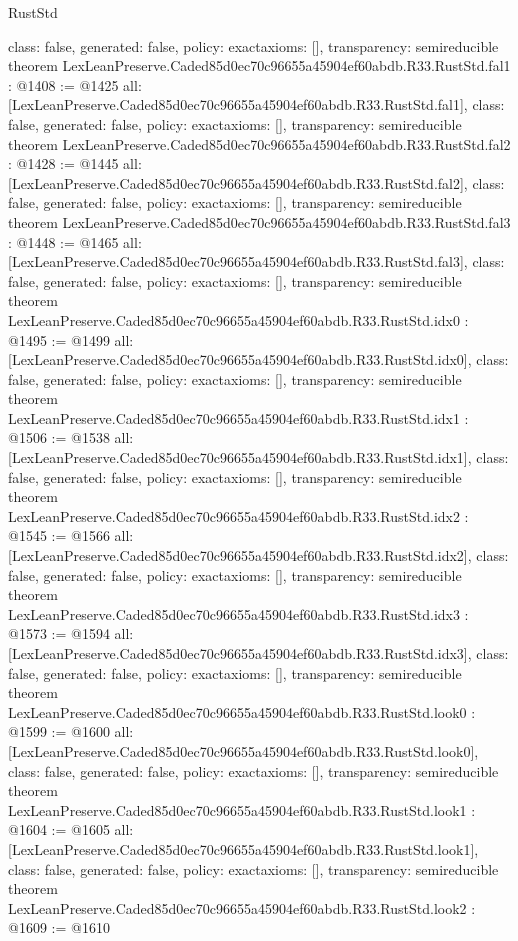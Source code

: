 \begin{lexlean}{RustStd}
\begin{coremodule}
{  class: false,
  generated: false,
  policy: exact{axioms: []},
  transparency: semireducible
}
theorem LexLeanPreserve.Caded85d0ec70c96655a45904ef60abdb.R33.RustStd.fal1 : @1408 := @1425 {
  all: [LexLeanPreserve.Caded85d0ec70c96655a45904ef60abdb.R33.RustStd.fal1],
  class: false,
  generated: false,
  policy: exact{axioms: []},
  transparency: semireducible
}
theorem LexLeanPreserve.Caded85d0ec70c96655a45904ef60abdb.R33.RustStd.fal2 : @1428 := @1445 {
  all: [LexLeanPreserve.Caded85d0ec70c96655a45904ef60abdb.R33.RustStd.fal2],
  class: false,
  generated: false,
  policy: exact{axioms: []},
  transparency: semireducible
}
theorem LexLeanPreserve.Caded85d0ec70c96655a45904ef60abdb.R33.RustStd.fal3 : @1448 := @1465 {
  all: [LexLeanPreserve.Caded85d0ec70c96655a45904ef60abdb.R33.RustStd.fal3],
  class: false,
  generated: false,
  policy: exact{axioms: []},
  transparency: semireducible
}
theorem LexLeanPreserve.Caded85d0ec70c96655a45904ef60abdb.R33.RustStd.idx0 : @1495 := @1499 {
  all: [LexLeanPreserve.Caded85d0ec70c96655a45904ef60abdb.R33.RustStd.idx0],
  class: false,
  generated: false,
  policy: exact{axioms: []},
  transparency: semireducible
}
theorem LexLeanPreserve.Caded85d0ec70c96655a45904ef60abdb.R33.RustStd.idx1 : @1506 := @1538 {
  all: [LexLeanPreserve.Caded85d0ec70c96655a45904ef60abdb.R33.RustStd.idx1],
  class: false,
  generated: false,
  policy: exact{axioms: []},
  transparency: semireducible
}
theorem LexLeanPreserve.Caded85d0ec70c96655a45904ef60abdb.R33.RustStd.idx2 : @1545 := @1566 {
  all: [LexLeanPreserve.Caded85d0ec70c96655a45904ef60abdb.R33.RustStd.idx2],
  class: false,
  generated: false,
  policy: exact{axioms: []},
  transparency: semireducible
}
theorem LexLeanPreserve.Caded85d0ec70c96655a45904ef60abdb.R33.RustStd.idx3 : @1573 := @1594 {
  all: [LexLeanPreserve.Caded85d0ec70c96655a45904ef60abdb.R33.RustStd.idx3],
  class: false,
  generated: false,
  policy: exact{axioms: []},
  transparency: semireducible
}
theorem LexLeanPreserve.Caded85d0ec70c96655a45904ef60abdb.R33.RustStd.look0 : @1599 := @1600 {
  all: [LexLeanPreserve.Caded85d0ec70c96655a45904ef60abdb.R33.RustStd.look0],
  class: false,
  generated: false,
  policy: exact{axioms: []},
  transparency: semireducible
}
theorem LexLeanPreserve.Caded85d0ec70c96655a45904ef60abdb.R33.RustStd.look1 : @1604 := @1605 {
  all: [LexLeanPreserve.Caded85d0ec70c96655a45904ef60abdb.R33.RustStd.look1],
  class: false,
  generated: false,
  policy: exact{axioms: []},
  transparency: semireducible
}
theorem LexLeanPreserve.Caded85d0ec70c96655a45904ef60abdb.R33.RustStd.look2 : @1609 := @1610 {
}
\end{coremodule}
\end{lexlean}
